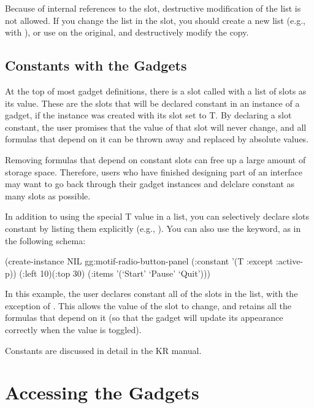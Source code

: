 Because of internal references to the  slot, destructive
modification of the  list is not allowed.  If you change the list
in the  slot, you should create a new list (e.g., with ),
or use  on the original, and destructively modify the copy.


\section{Constants with the Gadgets}
At the top of most gadget definitions, there is a slot called
 with a list of slots as its value.  These are the
slots that will be declared constant in an instance of a gadget, if
the instance was created with its  slot set to T.  By
declaring a slot constant, the user promises that the value of that
slot will never change, and all formulas that depend on it can be
thrown away and replaced by absolute values.

Removing formulas that depend on constant slots can free up a large
amount of storage space.  Therefore, users who have finished designing
part of an interface may want to go back through their gadget
instances and delclare constant as many slots as possible.

In addition to using the special T value in a  list,
you can selectively declare slots constant by listing them
explicitly (e.g., ).
You can also use the  keyword, as in the following schema:
\begin{programexample}
(create-instance NIL gg:motif-radio-button-panel
   (:constant '(T :except :active-p))
   (:left 10)(:top 30)
   (:items '(`Start' `Pause' `Quit')))
\end{programexample}
In this example, the user declares constant all of the slots in the
 list, with the exception of .  This
allows the value of the  slot to change, and retains all
the formulas that depend on it (so that the gadget will update its
appearance correctly when the value is toggled).

Constants are discussed in detail in the KR manual.


\chapter{Accessing the Gadgets}
\label{accessing}

